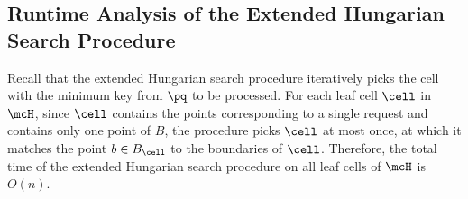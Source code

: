 

\subsection{Runtime Analysis of the Extended Hungarian Search Procedure}\label{appendix:hung_time}
Recall that the extended Hungarian search procedure iteratively picks the cell with the minimum key from $\pq$ to be processed.
For each leaf cell $\cell$ in $\mcH$, since $\cell$ contains the points corresponding to a single request and contains only one point of $B$, the procedure picks $\cell$ at most once, at which it matches the point $b\in B_\cell$ to the boundaries of $\cell$. Therefore, the total time of the extended Hungarian search procedure on all leaf cells of $\mcH$ is $O(n)$. 


